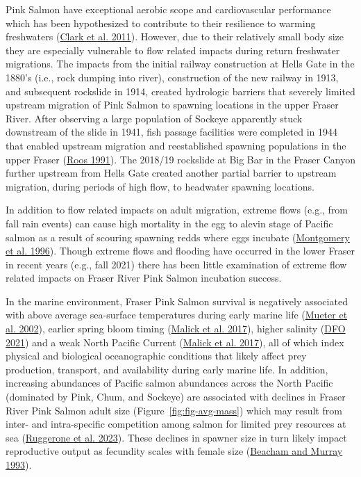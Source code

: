 \documentclass[11pt]{book}
\begin{document}
Pink Salmon have exceptional aerobic scope and cardiovascular performance which has been hypothesized to contribute to their resilience to warming freshwaters (\protect\hyperlink{ref-clarkExceptionalAerobicScope2011}{Clark et al. 2011}). However, due to their relatively small body size they are especially vulnerable to flow related impacts during return freshwater migrations. The impacts from the initial railway construction at Hells Gate in the 1880's (i.e., rock dumping into river), construction of the new railway in 1913, and subsequent rockslide in 1914, created hydrologic barriers that severely limited upstream migration of Pink Salmon to spawning locations in the upper Fraser River. After observing a large population of Sockeye apparently stuck downstream of the slide in 1941, fish passage facilities were completed in 1944 that enabled upstream migration and reestablished spawning populations in the upper Fraser (\protect\hyperlink{ref-roosRestoringFraserRiver1991}{Roos 1991}). The 2018/19 rockslide at Big Bar in the Fraser Canyon further upstream from Hells Gate created another partial barrier to upstream migration, during periods of high flow, to headwater spawning locations.

In addition to flow related impacts on adult migration, extreme flows (e.g., from fall rain events) can cause high mortality in the egg to alevin stage of Pacific salmon as a result of scouring spawning redds where eggs incubate (\protect\hyperlink{ref-montgomeryStreambedScourEgg1996}{Montgomery et al. 1996}). Though extreme flows and flooding have occurred in the lower Fraser in recent years (e.g., fall 2021) there has been little examination of extreme flow related impacts on Fraser River Pink Salmon incubation success.

In the marine environment, Fraser Pink Salmon survival is negatively associated with above average sea-surface temperatures during early marine life (\protect\hyperlink{ref-mueterOppositeEffectsOcean2002}{Mueter et al. 2002}), earlier spring bloom timing (\protect\hyperlink{ref-malickEffectsNorthPacific2017}{Malick et al. 2017}), higher salinity (\protect\hyperlink{ref-dfoPreseasonRunSize2021}{DFO 2021}) and a weak North Pacific Current (\protect\hyperlink{ref-malickEffectsNorthPacific2017}{Malick et al. 2017}), all of which index physical and biological oceanographic conditions that likely affect prey production, transport, and availability during early marine life. In addition, increasing abundances of Pacific salmon abundances across the North Pacific (dominated by Pink, Chum, and Sockeye) are associated with declines in Fraser River Pink Salmon adult size (Figure~\ref{fig:fig-avg-mass}) which may result from inter- and intra-specific competition among salmon for limited prey resources at sea (\protect\hyperlink{ref-ruggeroneDiatomsKillerWhales2023}{Ruggerone et al. 2023}). These declines in spawner size in turn likely impact reproductive output as fecundity scales with female size (\protect\hyperlink{ref-beachamFecundityEggSize1993}{Beacham and Murray 1993}).
\end{document}
